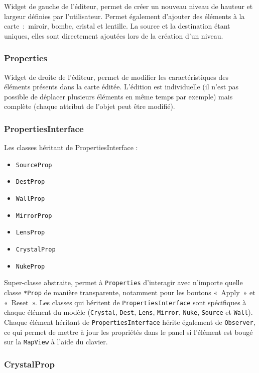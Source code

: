 \documentclass[]{report}
\begin{document}
Widget de gauche de l’éditeur, permet de créer un nouveau niveau de hauteur et largeur définies par l’utilisateur.
Permet également d’ajouter des éléments à la carte~:~miroir, bombe, cristal et lentille. La source et la destination étant uniques, elles sont directement ajoutées lors de la création d’un niveau.

\subsubsection{\label{Properties}Properties}

Widget de droite de l’éditeur, permet de modifier les caractéristiques des éléments présents dans la carte éditée.
L’édition est individuelle (il n’est pas possible de déplacer plusieurs éléments en même temps par exemple) mais complète (chaque attribut de l’objet peut être modifié).

\subsubsection{\label{PropertiesInterface}PropertiesInterface}

Les classes héritant de PropertiesInterface :

\begin{itemize}
    \item \texttt{SourceProp}
    \item \texttt{DestProp}
    \item \texttt{WallProp}
    \item \texttt{MirrorProp}
    \item \texttt{LensProp}
    \item \texttt{CrystalProp}
    \item \texttt{NukeProp}
\end{itemize}

Super-classe abstraite, permet à \texttt{Properties} d’interagir avec n’importe quelle classe \texttt{*Prop} de manière transparente, notamment pour les boutons «~Apply~» et «~Reset~».
Les classes qui héritent de \texttt{PropertiesInterface} sont spécifiques à chaque élément du modèle (\texttt{Crystal}, \texttt{Dest}, \texttt{Lens}, \texttt{Mirror}, \texttt{Nuke}, \texttt{Source} et \texttt{Wall}).
Chaque élément héritant de \texttt{PropertiesInterface} hérite également de \texttt{Observer}, ce qui permet de mettre à jour les propriétés dans le panel si l’élément est bougé sur la \texttt{MapView} à l’aide du clavier.

\subsubsection{\label{CrystalProp}CrystalProp}
\end{document}
